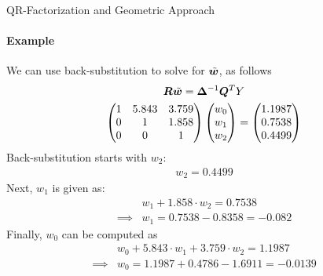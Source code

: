 \begin{frame}{QR-Factorization and Geometric Approach}
\framesubtitle{Example}
We can use back-substitution to solve for $\tilde{{\boldsymbol w}}$, as follows
\begin{gather*}
{\boldsymbol R}\tilde{{\boldsymbol w}}  = {\bm \Delta}^{-1} {\boldsymbol Q}^T Y\\
    \begin{pmatrix} 
        1 & 5.843 & 3.759\\
        0 & 1 & 1.858\\
        0 & 0 & 1
     \end{pmatrix} \begin{pmatrix} w_0\\w_1\\w_2 \end{pmatrix}  = \begin{pmatrix} 1.1987\\ 0.7538\\ 0.4499 \end{pmatrix}
\end{gather*}
Back-substitution starts with $w_2$:
\begin{align*}
    w_2 = 0.4499
\end{align*}
Next, $w_1$ is given as:
\begin{align*}
    & w_1 + 1.858 \cdot w_2 = 0.7538\\
    \implies & w_1 = 0.7538 - 0.8358 = -0.082
\end{align*}
Finally, $w_0$ can be computed as
\begin{align*}
    & w_0 + 5.843 \cdot w_1 + 3.759 \cdot w_2 = 1.1987\\
    \implies & w_0 = 1.1987 + 0.4786 - 1.6911 = -0.0139
\end{align*}
\end{frame}

